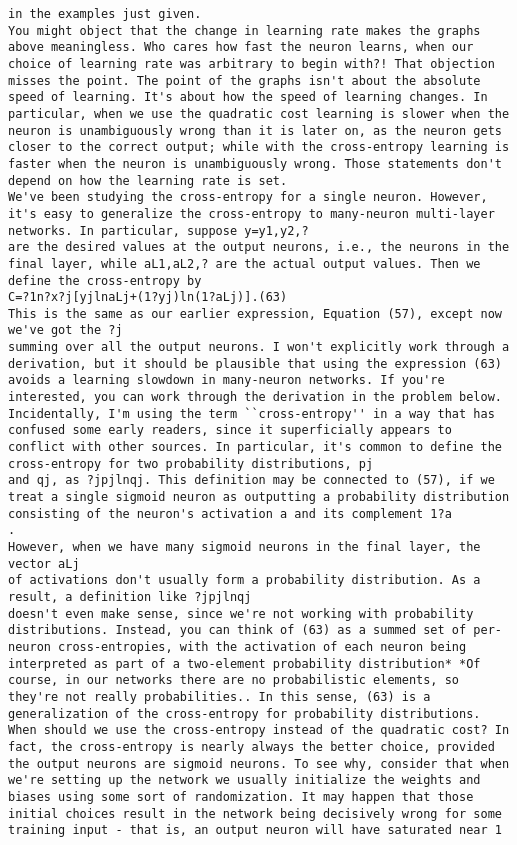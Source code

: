 \begin{lstlisting}
in the examples just given.
You might object that the change in learning rate makes the graphs above meaningless. Who cares how fast the neuron learns, when our choice of learning rate was arbitrary to begin with?! That objection misses the point. The point of the graphs isn't about the absolute speed of learning. It's about how the speed of learning changes. In particular, when we use the quadratic cost learning is slower when the neuron is unambiguously wrong than it is later on, as the neuron gets closer to the correct output; while with the cross-entropy learning is faster when the neuron is unambiguously wrong. Those statements don't depend on how the learning rate is set. 
We've been studying the cross-entropy for a single neuron. However, it's easy to generalize the cross-entropy to many-neuron multi-layer networks. In particular, suppose y=y1,y2,?
are the desired values at the output neurons, i.e., the neurons in the final layer, while aL1,aL2,? are the actual output values. Then we define the cross-entropy by 
C=?1n?x?j[yjlnaLj+(1?yj)ln(1?aLj)].(63)
This is the same as our earlier expression, Equation (57), except now we've got the ?j
summing over all the output neurons. I won't explicitly work through a derivation, but it should be plausible that using the expression (63) avoids a learning slowdown in many-neuron networks. If you're interested, you can work through the derivation in the problem below. 
Incidentally, I'm using the term ``cross-entropy'' in a way that has confused some early readers, since it superficially appears to conflict with other sources. In particular, it's common to define the cross-entropy for two probability distributions, pj
and qj, as ?jpjlnqj. This definition may be connected to (57), if we treat a single sigmoid neuron as outputting a probability distribution consisting of the neuron's activation a and its complement 1?a
.
However, when we have many sigmoid neurons in the final layer, the vector aLj
of activations don't usually form a probability distribution. As a result, a definition like ?jpjlnqj
doesn't even make sense, since we're not working with probability distributions. Instead, you can think of (63) as a summed set of per-neuron cross-entropies, with the activation of each neuron being interpreted as part of a two-element probability distribution* *Of course, in our networks there are no probabilistic elements, so they're not really probabilities.. In this sense, (63) is a generalization of the cross-entropy for probability distributions.
When should we use the cross-entropy instead of the quadratic cost? In fact, the cross-entropy is nearly always the better choice, provided the output neurons are sigmoid neurons. To see why, consider that when we're setting up the network we usually initialize the weights and biases using some sort of randomization. It may happen that those initial choices result in the network being decisively wrong for some training input - that is, an output neuron will have saturated near 1

\end{lstlisting}
